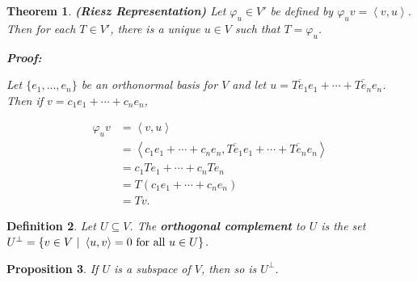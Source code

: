\documentclass{article}
\theoremstyle{colontheorem}
\newtheorem{theorem}{Theorem}[section]
\newtheorem{proposition}[theorem]{Proposition}
\newtheorem{definition}[theorem]{Definition}
\newenvironment{Theorem}
{
	\begin{mdframed}[backgroundcolor=TheoremOrange!10]
	\begin{theorem}
}
{
	\end{theorem}
	\end{mdframed}
	
	\vspace{.15in}
}
\newenvironment{Proposition}
{
	\begin{mdframed}[backgroundcolor=TheoremOrange!10]
	\begin{proposition}
}
{
	\end{proposition}
	\end{mdframed}
	
	\vspace{.15in}
}
\newenvironment{Def}
{
	\begin{mdframed}[backgroundcolor=DefGreen!10]
	\begin{definition}
}
{
	\end{definition}
	\end{mdframed}
	
	\vspace{.15in}
}
\newenvironment{Proof}
{
	\begin{mdframed}[backgroundcolor=ProofPurple!10]
	\textbf{Proof:}%
}
{
	\end{mdframed}
	
	\vspace{.085in}
}
\begin{document}
\begin{Theorem}
	
	\textbf{(Riesz Representation)} Let $\varphi_u \in V'$ be defined by $\varphi_u v = \left< v, u \right>$. Then for each $T \in V'$, there is a unique $u \in V$ such that $T = \varphi_u$.
	
	
	\begin{Proof}
		Let $\{e_1, ..., e_n\}$ be an orthonormal basis for $V$ and let $u = \overline{Te_1}e_1 + \cdots + \overline{Te_n}e_n$. Then if $v = c_1 e_1 + \cdots + c_n e_n$,
		
		\begin{align*}
			\varphi_u v &= \left< v, u \right>\\
			&= \left< c_1 e_1 + \cdots + c_n e_n, \overline{Te_1}e_1 + \cdots + \overline{Te_n}e_n \right>\\
			&= c_1 T e_1 + \cdots + c_n T e_n\\
			&= T(c_1 e_1 + \cdots + c_n e_n)\\
			&= Tv.
		\end{align*}
		
	\end{Proof}
	
\end{Theorem}



\begin{Def}
	
	Let $U \subseteq V$. The \textbf{orthogonal complement} to $U$ is the set $U^\perp = \{v \in V\ |\ \left< u, v \right> = 0\ \textnormal{for all}\ u \in U\}$.
	
\end{Def}



\begin{Proposition}
	
	If $U$ is a subspace of $V$, then so is $U^\perp$.
	
\end{Proposition}
\end{document}
